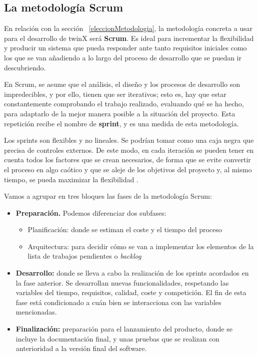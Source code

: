 \subsection{La metodología Scrum}
En relación con la sección ~\ref{eleccionMetodologia}, la metodología concreta a usar para el desarrollo de twinX será \textbf{Scrum}. Es ideal para incrementar la flexibilidad y producir un sistema que pueda responder ante tanto requisitos iniciales como los que se van añadiendo a lo largo del proceso de desarrollo que se puedan ir descubriendo.

En Scrum, se asume que el análisis, el diseño y los procesos de desarrollo son impredecibles, y por ello, tienen que ser iterativos; esto es, hay que estar constantemente comprobando el trabajo realizado, evaluando qué se ha hecho, para adaptarlo de la mejor manera posible a la situación del proyecto. Esta repetición recibe el nombre de \textbf{sprint}, y es una medida de esta metodología.

Los sprints son flexibles y no lineales. Se podrían tomar como una caja negra que precisa de controles externos. De este modo, en cada iteración se pueden tener en cuenta todos los factores que se crean necesarios, de forma que se evite convertir el proceso en algo caótico y que se aleje de los objetivos del proyecto y, al mismo tiempo, se pueda maximizar la flexibilidad \cite{scrum}.

Vamos a agrupar en tres bloques las fases de la metodología Scrum:
\begin{itemize}
	\item \textbf{Preparación.} Podemos diferenciar dos subfases:
	\begin{itemize}
		\item Planificación: donde se estiman el coste y el tiempo del proceso
		\item Arquitectura: para decidir cómo se van a implementar los elementos de la lista de trabajos pendientes o \textit{backlog}
	\end{itemize} 
	\item \textbf{Desarrollo:} donde se lleva a cabo la realización de los sprints acordados en la fase anterior. Se desarrollan nuevas funcionalidades, respetando las variables del tiempo, requisitos, calidad, coste y competición. El fin de esta fase está condicionado a cuán bien se interacciona con las variables mencionadas.
	\item \textbf{Finalización:} preparación para el lanzamiento del producto, donde se incluye la documentación final, y unas pruebas que se realizan con anterioridad a la versión final del software.
\end{itemize}

